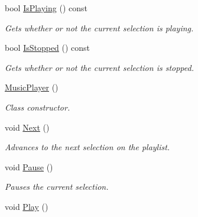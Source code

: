 \begin{DoxyCompactItemize}
bool \hyperlink{classMezzanine_1_1Audio_1_1MusicPlayer_a9be65aec3b31c478d2318dc5f0946de9}{IsPlaying} () const 
\begin{DoxyCompactList}\small\item\em Gets whether or not the current selection is playing. \item\end{DoxyCompactList}\item 
bool \hyperlink{classMezzanine_1_1Audio_1_1MusicPlayer_ad62a633359931e0f7fa2b0ed5eb0ef9b}{IsStopped} () const 
\begin{DoxyCompactList}\small\item\em Gets whether or not the current selection is stopped. \item\end{DoxyCompactList}\item 
\hypertarget{classMezzanine_1_1Audio_1_1MusicPlayer_a2992703e8a2441b72409b4f4b683b6f0}{
\hyperlink{classMezzanine_1_1Audio_1_1MusicPlayer_a2992703e8a2441b72409b4f4b683b6f0}{MusicPlayer} ()}
\label{classMezzanine_1_1Audio_1_1MusicPlayer_a2992703e8a2441b72409b4f4b683b6f0}

\begin{DoxyCompactList}\small\item\em Class constructor. \item\end{DoxyCompactList}\item 
\hypertarget{classMezzanine_1_1Audio_1_1MusicPlayer_ac4fa784478176f750d166034eb491f2f}{
void \hyperlink{classMezzanine_1_1Audio_1_1MusicPlayer_ac4fa784478176f750d166034eb491f2f}{Next} ()}
\label{classMezzanine_1_1Audio_1_1MusicPlayer_ac4fa784478176f750d166034eb491f2f}

\begin{DoxyCompactList}\small\item\em Advances to the next selection on the playlist. \item\end{DoxyCompactList}\item 
\hypertarget{classMezzanine_1_1Audio_1_1MusicPlayer_acce40baf0f7f04ec14c6dbdba4794480}{
void \hyperlink{classMezzanine_1_1Audio_1_1MusicPlayer_acce40baf0f7f04ec14c6dbdba4794480}{Pause} ()}
\label{classMezzanine_1_1Audio_1_1MusicPlayer_acce40baf0f7f04ec14c6dbdba4794480}

\begin{DoxyCompactList}\small\item\em Pauses the current selection. \item\end{DoxyCompactList}\item 
\hypertarget{classMezzanine_1_1Audio_1_1MusicPlayer_ad0666abad1858e0d9c1be2af98c961f6}{
void \hyperlink{classMezzanine_1_1Audio_1_1MusicPlayer_ad0666abad1858e0d9c1be2af98c961f6}{Play} ()}
\label{classMezzanine_1_1Audio_1_1MusicPlayer_ad0666abad1858e0d9c1be2af98c961f6}


\end{DoxyCompactItemize}
